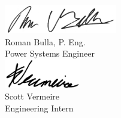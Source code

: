 \begin{multicols}{2}
\centering
\includegraphics[height=0.5in, keepaspectratio=true]{../Images/Roman_signature.jpg} \\
Roman Bulla, P. Eng. \\Power Systems Engineer \\
\includegraphics[height=0.5in, keepaspectratio=true]{../Images/Scott_signature.jpg} \\
Scott Vermeire \\Engineering Intern \\
\end{multicols}

\pagebreak


